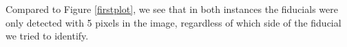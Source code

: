 \documentclass[10pt]{scrartcl}
\begin{document}

Compared to Figure \ref{firstplot}, we see that in both instances the fiducials were only detected with 5 pixels in the image, regardless of which side of the fiducial we tried to identify.



\end{document}

